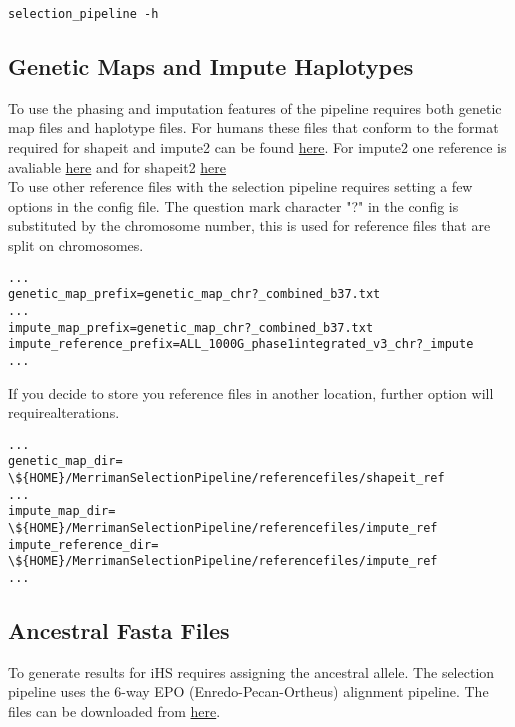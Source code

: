 \documentclass[a4paper,10pt]{article}
\begin{document}
\begin{verbatim}
selection_pipeline -h
\end{verbatim}

\subsection{Genetic Maps and Impute Haplotypes}
To use the phasing and imputation features of the pipeline requires both genetic map files and haplotype files. For humans these files that conform to the format required for shapeit and impute2 can be found \href{http://mathgen.stats.ox.ac.uk/impute/impute_v2.html#reference}{here}. For impute2 one reference is avaliable \href{http://mathgen.stats.ox.ac.uk/impute/ALL_1000G_phase1integrated_v3_impute_macGT1.tgz}{here} and for shapeit2 \href{http://www.shapeit.fr/files/genetic_map_b37.tar.gz}{here}\\

To use other reference files with the selection pipeline requires setting a few options in the config file. The question mark character "?" in the config is substituted by the chromosome number, this is used for reference files that are split on chromosomes.\\
\begin{verbatim}
...
genetic_map_prefix=genetic_map_chr?_combined_b37.txt
...
impute_map_prefix=genetic_map_chr?_combined_b37.txt
impute_reference_prefix=ALL_1000G_phase1integrated_v3_chr?_impute
...
\end{verbatim}

If you decide to store you reference files in another location, further option will requirealterations.\\ 
\begin{verbatim}
...
genetic_map_dir= \${HOME}/MerrimanSelectionPipeline/referencefiles/shapeit_ref
...
impute_map_dir= \${HOME}/MerrimanSelectionPipeline/referencefiles/impute_ref
impute_reference_dir= \${HOME}/MerrimanSelectionPipeline/referencefiles/impute_ref
...
\end{verbatim}

\subsection{Ancestral Fasta Files}
To generate results for iHS requires assigning the ancestral allele. The selection pipeline uses the 6-way EPO (Enredo-Pecan-Ortheus) alignment pipeline. The files can be downloaded from \href{ftp://ftp.1000genomes.ebi.ac.uk/vol1/ftp/phase1/analysis_results/supporting/ancestral_alignments/human_ancestor_GRCh37_e59.tar.bz2}{here}.
\end{document}
